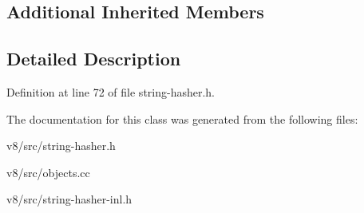 \subsection*{Additional Inherited Members}


\subsection{Detailed Description}


Definition at line 72 of file string-\/hasher.\+h.



The documentation for this class was generated from the following files\+:\begin{DoxyCompactItemize}
\item 
v8/src/string-\/hasher.\+h\item 
v8/src/objects.\+cc\item 
v8/src/string-\/hasher-\/inl.\+h\end{DoxyCompactItemize}
